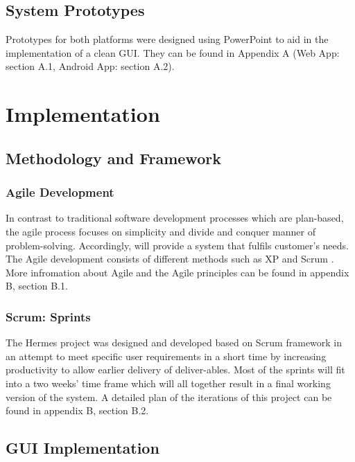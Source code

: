 \documentclass{article}
\begin{document}
\subsection{System Prototypes}
Prototypes for both platforms were designed using PowerPoint to aid in the implementation of a clean GUI. They can be found in Appendix A (Web App: section A.1, Android App: section A.2). 

\newpage
\section{Implementation}
\subsection{Methodology and Framework}
\subsubsection{Agile Development}
In contrast to traditional software development processes which are plan-based, the agile process focuses on simplicity and divide and conquer manner of problem-solving. Accordingly, will provide a system that fulfils customer's needs. The Agile development consists of different methods such as XP and Scrum \cite{Agile-Scrum}. More infromation about Agile and the Agile principles can be found in appendix B, section B.1. 

\subsubsection{Scrum: Sprints}
The Hermes project was designed and developed based on Scrum framework in an attempt to meet specific user requirements in a short time by increasing productivity to allow earlier delivery of deliver-ables. Most of the sprints will fit into a two weeks’ time frame which will all together result in a final working version of the system. A detailed plan of the iterations of this project can be found in appendix B, section B.2. 

\subsection{GUI Implementation}
\end{document}
